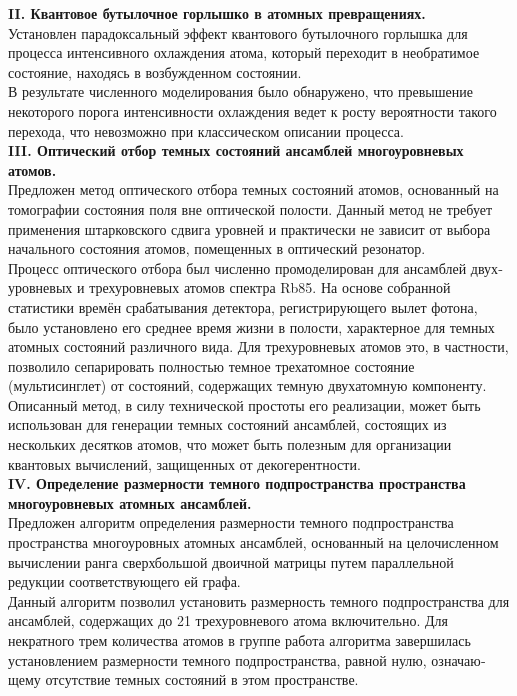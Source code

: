 \clearpage
\noindent\textbf{II. Квантовое бутылочное горлышко в атомных превращениях.}
\\[18pt]
Установлен парадоксальный эффект квантового бутылочного горлышка для процесса интенсивного охлаждения атома, который переходит в необратимое состояние, находясь в возбужденном состоянии.
\\[18pt]
В результате численного моделирования было обнаружено, что превышение некоторого порога интенсивности охлаждения ведет к росту вероятности та­кого перехода, что невозможно при классическом описании процесса.
\\[24pt]
\noindent\textbf{III. Оптический отбор темных состояний ансамблей многоуровневых атомов.}
\\[18pt]
Предложен метод оптического отбора темных состо­яний атомов, основанный на томографии состояния поля вне оптической полости. Данный метод не требует применения штарковского сдвига уровней и практически не зависит от выбора начального состояния ато­мов, помещенных в оптический резонатор.
\\[18pt]
\noindent Процесс оптического отбора был численно промоделирован для ансамблей двух­уровневых и трехуровневых атомов спектра Rb85. На основе собранной статистики времён срабатывания детектора, регистрирующего вылет фотона, было установлено его среднее время жизни  в полости, характерное для темных атомных состояний различного вида. Для трехуровневых атомов это, в частности, позволило сепарировать полностью тем­ное трехатомное состояние (мультисинглет) от состояний, содержащих темную двухатомную компоненту.
\\[18pt]
Описанный метод, в силу технической простоты его реализации, может быть использован для генерации темных состояний ансамблей, состоящих из нескольких десятков атомов, что может быть полезным для организации квантовых вычислений, защищенных от декогерентности.
\\[24pt]
\noindent\textbf{IV. Определение размерности темного подпространства пространства многоуровневых атомных ансамблей.}
\\[18pt]
\noindent Предложен алгоритм определения размерности темного подпространства пространства многоуровных атомных ансамблей, основанный на целочислен­ном вычислении ранга сверхбольшой двоичной матрицы путем параллельной редукции соответствующего ей графа.
\\[18pt]
Данный алгоритм позволил установить размерность темного подпространства для ансамблей, содержащих до 21 трехуровневого атома включительно. Для некратного трем количества атомов в группе работа алгоритма завершилась установлением размерности темного подпространства, равной нулю, означаю­щему отсутствие темных состояний в этом пространстве.
